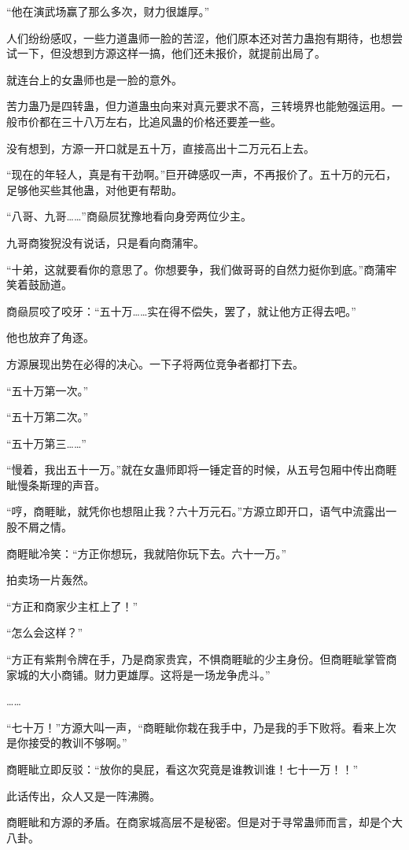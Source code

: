 \begin{this_body}
“他在演武场赢了那么多次，财力很雄厚。”

人们纷纷感叹，一些力道蛊师一脸的苦涩，他们原本还对苦力蛊抱有期待，也想尝试一下，但没想到方源这样一搞，他们还未报价，就提前出局了。

就连台上的女蛊师也是一脸的意外。

苦力蛊乃是四转蛊，但力道蛊虫向来对真元要求不高，三转境界也能勉强运用。一般市价都在三十八万左右，比追风蛊的价格还要差一些。

没有想到，方源一开口就是五十万，直接高出十二万元石上去。

“现在的年轻人，真是有干劲啊。”巨开碑感叹一声，不再报价了。五十万的元石，足够他买些其他蛊，对他更有帮助。

“八哥、九哥……”商赑屃犹豫地看向身旁两位少主。

九哥商狻猊没有说话，只是看向商蒲牢。

“十弟，这就要看你的意思了。你想要争，我们做哥哥的自然力挺你到底。”商蒲牢笑着鼓励道。

商赑屃咬了咬牙：“五十万……实在得不偿失，罢了，就让他方正得去吧。”

他也放弃了角逐。

方源展现出势在必得的决心。一下子将两位竞争者都打下去。

“五十万第一次。”

“五十万第二次。”

“五十万第三……”

“慢着，我出五十一万。”就在女蛊师即将一锤定音的时候，从五号包厢中传出商睚眦慢条斯理的声音。

“哼，商睚眦，就凭你也想阻止我？六十万元石。”方源立即开口，语气中流露出一股不屑之情。

商睚眦冷笑：“方正你想玩，我就陪你玩下去。六十一万。”

拍卖场一片轰然。

“方正和商家少主杠上了！”

“怎么会这样？”

“方正有紫荆令牌在手，乃是商家贵宾，不惧商睚眦的少主身份。但商睚眦掌管商家城的大小商铺。财力更雄厚。这将是一场龙争虎斗。”

……

“七十万！”方源大叫一声，“商睚眦你栽在我手中，乃是我的手下败将。看来上次是你接受的教训不够啊。”

商睚眦立即反驳：“放你的臭屁，看这次究竟是谁教训谁！七十一万！！”

此话传出，众人又是一阵沸腾。

商睚眦和方源的矛盾。在商家城高层不是秘密。但是对于寻常蛊师而言，却是个大八卦。


\end{this_body}
